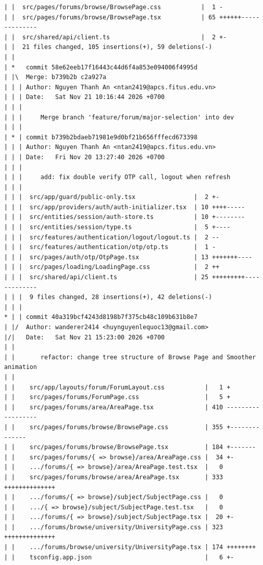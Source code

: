 \documentclass[12pt]{article}
\begin{document}
\begin{lstlisting}[numbers=none,breaklines=true]
| |  src/pages/forums/browse/BrowsePage.css           |  1 -
| |  src/pages/forums/browse/BrowsePage.tsx           | 65 ++++++--------------
| |  src/shared/api/client.ts                         |  2 +-
| |  21 files changed, 105 insertions(+), 59 deletions(-)
| |
| *   commit 58e62eeb17f16443c44d6f4a853e094006f4995d
| |\  Merge: b739b2b c2a927a
| | | Author: Nguyen Thanh An <ntan2419@apcs.fitus.edu.vn>
| | | Date:   Sat Nov 21 10:16:44 2026 +0700
| | |
| | |     Merge branch 'feature/forum/major-selection' into dev
| | |
| * | commit b739b2bdaeb71981e9d0bf21b656fffecd673398
| | | Author: Nguyen Thanh An <ntan2419@apcs.fitus.edu.vn>
| | | Date:   Fri Nov 20 13:27:40 2026 +0700
| | |
| | |     add: fix double verify OTP call, logout when refresh
| | |
| | |  src/app/guard/public-only.tsx                |  2 +-
| | |  src/app/providers/auth/auth-initializer.tsx  | 10 ++++-----
| | |  src/entities/session/auth-store.ts           | 10 +--------
| | |  src/entities/session/type.ts                 |  5 +----
| | |  src/features/authentication/logout/logout.ts |  2 --
| | |  src/features/authentication/otp/otp.ts       |  1 -
| | |  src/pages/auth/otp/OtpPage.tsx               | 13 +++++++----
| | |  src/pages/loading/LoadingPage.css            |  2 ++
| | |  src/shared/api/client.ts                     | 25 +++++++++-------------
| | |  9 files changed, 28 insertions(+), 42 deletions(-)
| | |
* | | commit 40a319bcf4243d8198b7f375cb48c109b631b8e7
| |/  Author: wanderer2414 <huynguyenlequoc13@gmail.com>
|/|   Date:   Sat Nov 21 15:23:00 2026 +0700
| |
| |       refactor: change tree structure of Browse Page and Smoother animation
| |
| |    src/app/layouts/forum/ForumLayout.css           |   1 +
| |    src/pages/forums/ForumPage.css                  |   5 +
| |    src/pages/forums/area/AreaPage.tsx              | 410 ------------------
| |    src/pages/forums/browse/BrowsePage.css          | 355 +--------------
| |    src/pages/forums/browse/BrowsePage.tsx          | 184 +-------
| |    src/pages/forums/{ => browse}/area/AreaPage.css |  34 +-
| |    .../forums/{ => browse}/area/AreaPage.test.tsx  |   0
| |    src/pages/forums/browse/area/AreaPage.tsx       | 333 ++++++++++++++
| |    .../forums/{ => browse}/subject/SubjectPage.css |   0
| |    .../{ => browse}/subject/SubjectPage.test.tsx   |   0
| |    .../forums/{ => browse}/subject/SubjectPage.tsx |  20 +-
| |    .../forums/browse/university/UniversityPage.css | 323 ++++++++++++++
| |    .../forums/browse/university/UniversityPage.tsx | 174 ++++++++
| |    tsconfig.app.json                               |   6 +-

\end{lstlisting}
\end{document}
